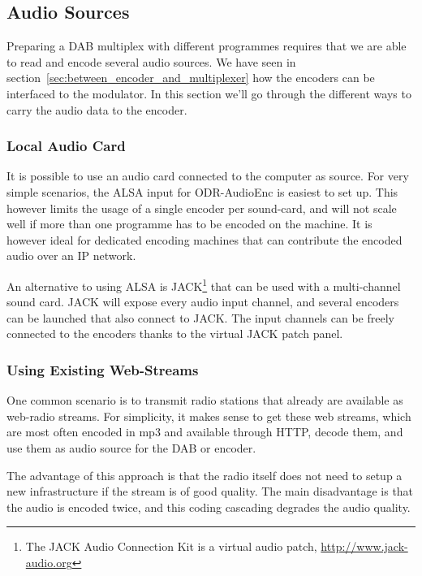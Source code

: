 \subsection{Audio Sources}
Preparing a DAB multiplex with different programmes requires that we are able to
read and encode several audio sources. We have seen in
section~\ref{sec:between_encoder_and_multiplexer} how the encoders can be
interfaced to the modulator. In this section we'll go through the different ways
to carry the audio data to the encoder.

\subsubsection{Local Audio Card}
It is possible to use an audio card connected to the computer as source. For
very simple scenarios, the ALSA input for ODR-AudioEnc is easiest to set up.
This however limits the usage of a single encoder per sound-card, and will not
scale well if more than one programme has to be encoded on the machine. It is
however ideal for dedicated encoding machines that can contribute the encoded
audio over an IP network.

An alternative to using ALSA is JACK\footnote{The JACK Audio Connection Kit is a
    virtual audio patch, \url{http://www.jack-audio.org}}
that can be used with a multi-channel sound card. JACK will expose every audio
input channel, and several encoders can be launched that also connect to JACK.
The input channels can be freely connected to the encoders thanks to the virtual
JACK patch panel.


\subsubsection{Using Existing Web-Streams}
\label{usingexistingwebstreams}
One common scenario is to transmit radio stations that already are available as
web-radio streams. For simplicity, it makes sense to get these web streams,
which are most often encoded in mp3 and available through HTTP, decode them, and
use them as audio source for the DAB or \dabplus encoder.

The advantage of this approach is that the radio itself does not need to setup a
new infrastructure if the stream is of good quality. The main disadvantage is
that the audio is encoded twice, and this coding cascading degrades the audio
quality.

